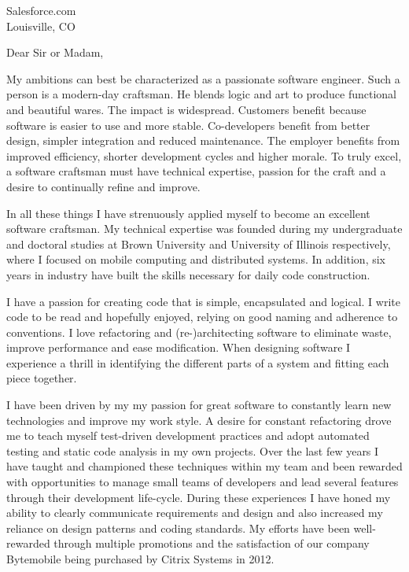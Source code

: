 \documentclass{letter}
\date{}
\begin{document}
\address{Nathanael Thompson\\1102 Lincolnshire Drive\\Champaign, IL 61821\\nat@alumni.brown.edu\\(469)
230-7125 (mobile)}
\signature{Nathanael Thompson}
\begin{letter}{Salesforce.com\\Louisville, CO}

\opening{Dear Sir or Madam,}
My ambitions can best be characterized as a passionate software
engineer.  Such a person is a modern-day craftsman.  He blends logic
and art to produce functional and beautiful wares.  The impact is
widespread.  Customers benefit because software is easier to use
and more stable.  Co-developers benefit from better design, simpler
integration and reduced maintenance.  The employer benefits from
improved efficiency, shorter development cycles and higher morale.
To truly excel, a software craftsman must have technical expertise,
passion for the craft and a desire to continually refine and improve.

In all these things I have strenuously applied myself to become an
excellent software craftsman.  My technical expertise was founded
during my undergraduate and doctoral studies at Brown University
and University of Illinois respectively, where I focused on mobile
computing and distributed systems.  In addition, six years in
industry have built the skills necessary for daily code construction.

I have a passion for creating code that is simple, encapsulated and
logical.  I write code to be read and hopefully enjoyed, relying
on good naming and adherence to conventions.  I love refactoring
and (re-)architecting software to eliminate waste, improve performance
and ease modification.  When designing software I experience a
thrill in identifying the different parts of a system and fitting
each piece together.

I have been driven by my my passion for great software to constantly
learn new technologies and improve my work style.  A desire for
constant refactoring drove me to teach myself test-driven development
practices and adopt automated testing and static code analysis in
my own projects.  Over the last few years I have taught and championed
these techniques within my team and been rewarded with opportunities
to manage small teams of developers and lead several features through
their development life-cycle.  During these experiences I have honed
my ability to clearly communicate requirements and design and
also increased my reliance on design patterns and coding standards.
My efforts have been well-rewarded through multiple promotions and
the satisfaction of our company Bytemobile being purchased by Citrix
Systems in 2012.


\end{letter}
\end{document}
